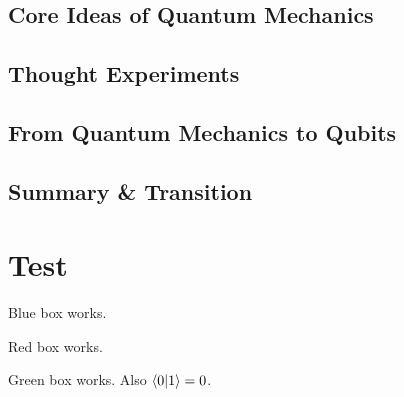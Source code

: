 \documentclass[12pt,oneside]{book}
\begin{document}
\section{Core Ideas of Quantum Mechanics}

\section{Thought Experiments}

\section{From Quantum Mechanics to Qubits}

\section{Summary \& Transition}

\chapter{Test}
\begin{bluebox}[Info]
Blue box works.
\end{bluebox}

\begin{redbox}[Warning]
Red box works.
\end{redbox}

\begin{greenbox}[Example]
Green box works. Also $\braket{0|1}=0$.
\end{greenbox}
\end{document}
